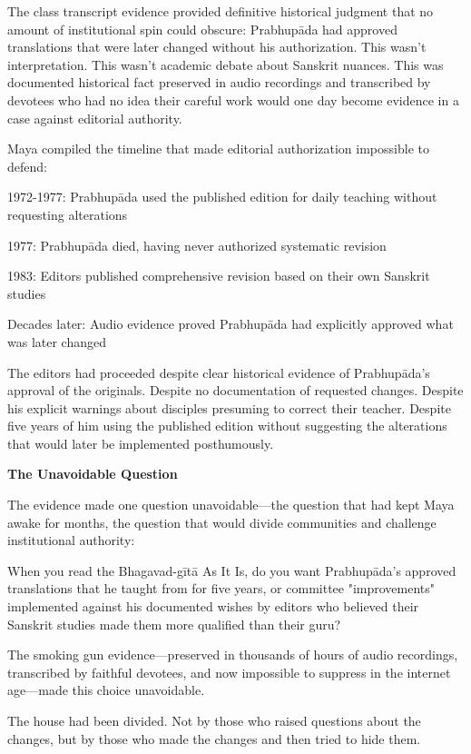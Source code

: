 \documentclass[12pt,twoside]{book}
\begin{document}
The class transcript evidence provided definitive historical judgment that no amount of institutional spin could obscure: Prabhupāda had approved translations that were later changed without his authorization. This wasn't interpretation. This wasn't academic debate about Sanskrit nuances. This was documented historical fact preserved in audio recordings and transcribed by devotees who had no idea their careful work would one day become evidence in a case against editorial authority.

Maya compiled the timeline that made editorial authorization impossible to defend:

1972-1977: Prabhupāda used the published edition for daily teaching without requesting alterations

1977: Prabhupāda died, having never authorized systematic revision

1983: Editors published comprehensive revision based on their own Sanskrit studies

Decades later: Audio evidence proved Prabhupāda had explicitly approved what was later changed

The editors had proceeded despite clear historical evidence of Prabhupāda's approval of the originals. Despite no documentation of requested changes. Despite his explicit warnings about disciples presuming to correct their teacher. Despite five years of him using the published edition without suggesting the alterations that would later be implemented posthumously.


\vspace{0.5cm}
\textbf{The Unavoidable Question}
\vspace{0.2cm}


The evidence made one question unavoidable—the question that had kept Maya awake for months, the question that would divide communities and challenge institutional authority:

When you read the Bhagavad-gītā As It Is, do you want Prabhupāda's approved translations that he taught from for five years, or committee "improvements" implemented against his documented wishes by editors who believed their Sanskrit studies made them more qualified than their guru?

The smoking gun evidence—preserved in thousands of hours of audio recordings, transcribed by faithful devotees, and now impossible to suppress in the internet age—made this choice unavoidable.

The house had been divided. Not by those who raised questions about the changes, but by those who made the changes and then tried to hide them.
\end{document}
